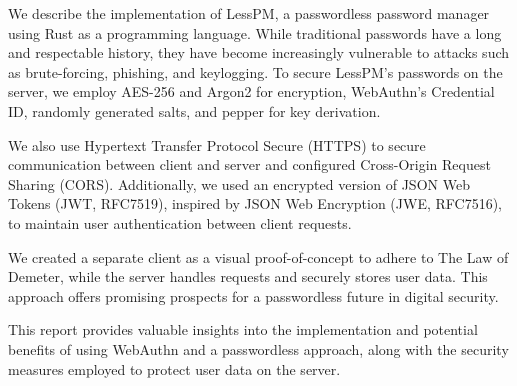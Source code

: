 We describe the implementation of LessPM, a passwordless password manager
using Rust as a programming language.
While traditional passwords have a long and respectable history, they have
become increasingly vulnerable to attacks such as brute-forcing, phishing, and
keylogging.
To secure LessPM's passwords on the server, we employ AES-256 and Argon2 for
encryption, WebAuthn's Credential ID, randomly generated salts, and pepper for
key derivation.

We also use Hypertext Transfer Protocol Secure (HTTPS) to secure
communication between client and server and configured Cross-Origin Request
Sharing (CORS).
Additionally, we used an encrypted version of JSON Web Tokens (JWT, RFC7519),
inspired by JSON Web Encryption (JWE, RFC7516), to maintain user authentication
between client requests.

We created a separate client as a visual proof-of-concept to adhere to The
Law of Demeter,
 while the server handles requests and securely stores user data.
This approach offers promising prospects for a passwordless future in digital
security.

This report provides valuable insights into the implementation and potential
benefits of using WebAuthn and a passwordless approach, along with the security
measures employed to protect user data on the server.